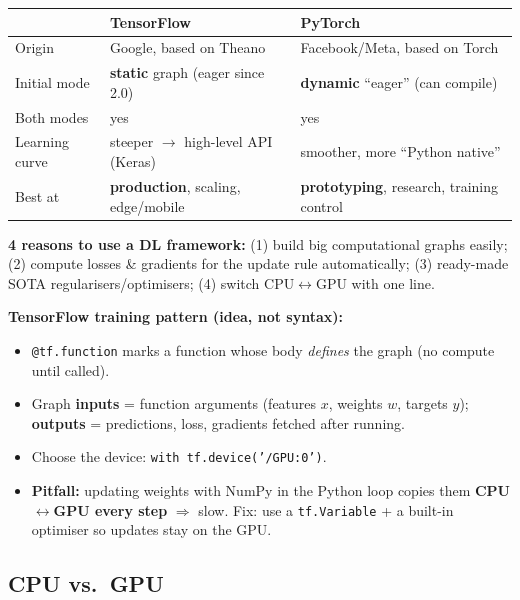 \documentclass[10pt,a4paper]{article}
\begin{document}
	\begin{center}
	\begin{tabular}{@{}p{2.7cm} p{5.3cm} p{5.3cm}@{}}
		\toprule
		& \textbf{TensorFlow} & \textbf{PyTorch} \\
		\midrule
		Origin    & Google, based on Theano & Facebook/Meta, based on Torch \\
		Initial mode & \textbf{static} graph (eager since 2.0) & \textbf{dynamic} ``eager'' (can compile) \\
		Both modes & yes & yes \\
		Learning curve & steeper $\to$ high-level API (Keras) & smoother, more ``Python native'' \\
		Best at   & \textbf{production}, scaling, edge/mobile & \textbf{prototyping}, research, training control \\
		\bottomrule
	\end{tabular}
	\end{center}

	\begin{definitionbox}
		\textbf{4 reasons to use a DL framework:} (1) build big computational graphs easily; (2) compute losses \& gradients for the update rule automatically; (3) ready-made SOTA regularisers/optimisers; (4) switch CPU$\leftrightarrow$GPU with one line.
	\end{definitionbox}

	\textbf{TensorFlow training pattern (idea, not syntax):}
	\begin{itemize}[leftmargin=*]
		\item \texttt{@tf.function} marks a function whose body \emph{defines} the graph (no compute until called).
		\item Graph \textbf{inputs} = function arguments (features $x$, weights $w$, targets $y$); \textbf{outputs} = predictions, loss, gradients fetched after running.
		\item Choose the device: \texttt{with tf.device('/GPU:0')}.
		\item \textbf{Pitfall:} updating weights with NumPy in the Python loop copies them \textbf{CPU$\leftrightarrow$GPU every step} $\Rightarrow$ slow. Fix: use a \texttt{tf.Variable} + a built-in optimiser so updates stay on the GPU.
	\end{itemize}

	\subsection{CPU vs.\ GPU}
\end{document}
